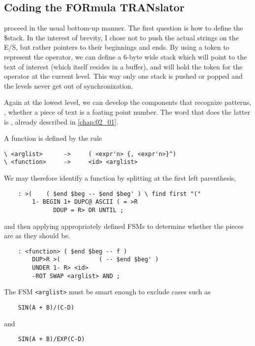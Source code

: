 \begin{dd}
\subsection{Coding the FORmula TRANslator}
 proceed in the usual bottom-up manner. The first question is how to define the \$stack. In the interest of brevity, I chose not to push the actual strings on the E/S, but rather pointers to their beginnings and ends. By using a token to represent the operator, we can define a 6-byte wide stack which will point to the text of interest (which itself resides in a buffer), and will hold the token for the operator at the current level. This way only one stack is pushed or popped and the levels never get out of synchronization.

Again at the lowest level, we can develop the components that recognize patterns, \eg, whether a piece of text is a foating point number. The word that does the latter is , already described in \ref{chap:02_01}.

A function is defined by the rule

\begin{verbatim}
\ <arglist>      ->     ( <expr'n> {, <expr'n>}^)
\ <function>     ->     <id> <arglist>
\end{verbatim}

We may therefore identify a function by splitting at the first left parenthesis,

\begin{lstlisting}
    : >(    ( $end $beg -- $end $beg' ) \ find first "("
        1- BEGIN 1+ DUPC@ ASCII ( = >R
              DDUP = R> OR UNTIL ;
\end{lstlisting}

and then applying appropriately defined FSMs to determine whether the pieces are as they should be.

\begin{lstlisting}
    : <function> ( $end $beg -- f )
        DUP>R >(           ( -- $end $beg' )
        UNDER 1- R> <id>
        -ROT SWAP <arglist> AND ;
\end{lstlisting}

The FSM \texttt{<arglist>} must be smart enough to exclude cases such as

\begin{lstlisting}
    SIN(A + B)/(C-D)
\end{lstlisting}

and

\begin{lstlisting}
    SIN(A + B)/EXP(C-D)
\end{lstlisting}


\end{dd}
